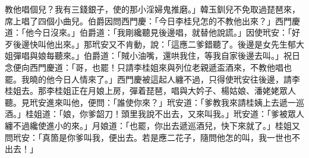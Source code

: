 教他唱個兒？我有三錢銀子，使的那小淫婦鬼推磨。」韓玉釧兒不免取過琵琶來，席上唱了四個小曲兒。伯爵因問西門慶：「今日李桂兒怎的不教他出來？」西門慶道：「他今日沒來。」伯爵道：「我剛纔聽見後邊唱，就替他說謊。」因使玳安：「好歹後邊快叫他出來。」那玳安又不肯動，說：「這應二爹錯聽了。後邊是女先生郁大姐彈唱與娘每聽來。」伯爵道：「賊小油嘴，還哄我住，等我自家後邊去叫。」祝日念便向西門慶道：「哥，也罷！只請李桂姐來與列位老親遞盃酒來，不教他唱也罷。我曉的他今日人情來了。」西門慶被這起人纏不過，只得使玳安往後邊，請李桂姐去。那李桂姐正在月娘上房，彈着琵琶，唱與大妗子、楊姑娘、潘姥姥眾人聽。見玳安進來叫他，便問：「誰使你來？」玳安道：「爹教我來請桂姨上去遞一巡酒。」桂姐道：「娘，你爹韶刀！頭里我說不出去，又來叫我。」玳安道：「爹被眾人纏不過纔使進小的來。」月娘道：「也罷，你出去遞巡酒兒，快下來就了。」桂姐又問玳安：「真箇是你爹叫我，便出去。若是應二花子，隨問他怎的叫，我一世也不出去！」

